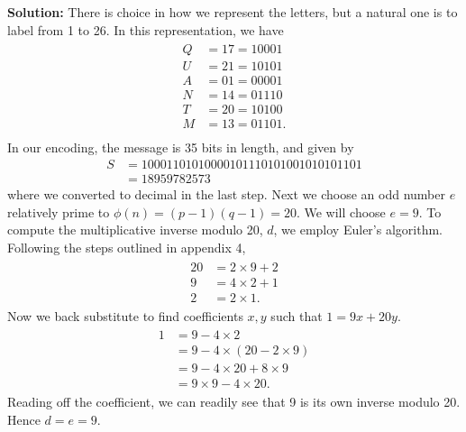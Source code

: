 \documentclass{book}
\begin{document}
    \textbf{Solution:} There is choice in how we represent the letters, but a natural one is to label from 1 to 26. In this representation, we have
    \begin{align}
    \begin{aligned}
        Q &= 17 = 10001 \\
        U &= 21 = 10101 \\
        A &= 01 = 00001 \\
        N &= 14 = 01110 \\
        T &= 20 = 10100 \\
        M &= 13 = 01101. \\
    \end{aligned}
    \end{align}
    In our encoding, the message is 35 bits in length, and given by
    \begin{align} \label{message}
        S &= 10001101010000101110101001010101101 \\
        &= 18959782573
    \end{align}
    where we converted to decimal in the last step. Next we choose an odd number $e$ relatively prime to $\phi(n) = (p-1)(q-1) = 20$. We will choose $e=9$. To compute the multiplicative inverse modulo 20, $d$, we employ Euler's algorithm. Following the steps outlined in appendix 4,
    \begin{align}
    \begin{aligned}
        20 &= 2\times 9 + 2 \\
        9 &= 4\times2 + 1 \\
        2 &= 2\times 1.
    \end{aligned}
    \end{align}
    Now we back substitute to find coefficients $x, y$ such that $1 = 9x + 20y$.
    \begin{align}
    \begin{aligned}
        1 &= 9-4\times 2 \\
        &= 9-4\times (20-2\times 9) \\
        &= 9 - 4\times 20 + 8\times 9 \\
        &= 9\times 9 -4\times 20.
    \end{aligned}
    \end{align}
    Reading off the coefficient, we can readily see that 9 is its own inverse modulo 20. Hence $d=e=9$. 
    
\end{document}
